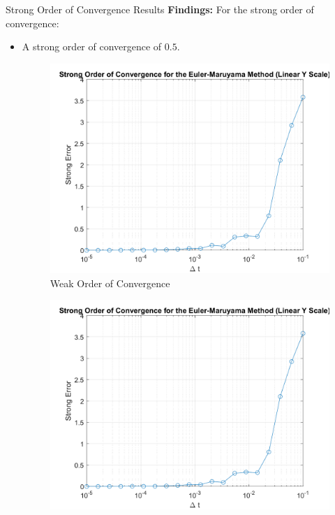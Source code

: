 \documentclass[compress,12pt]{beamer}
\begin{document}
\begin{frame}{Strong Order of Convergence Results}
    \textbf{Findings:} For the strong order of convergence:
    
    \begin{itemize}
        \item A strong order of convergence of \(0.5\). 
            
            \begin{minipage}{0.4\textwidth}
            \begin{figure}
                \centering
                \includegraphics[width=\linewidth]{project4Q3fig3.png} %
                \caption{Weak Order of Convergence}
                \label{fig:enter-label}
            \end{figure}
            \end{minipage}%
            \hfill %
            \begin{minipage}{0.4\textwidth}
            \begin{figure}
                \centering
                \includegraphics[width=\linewidth]{project4Q3fig3.png} %

\end{figure}
\end{minipage}
\end{itemize}
\end{frame}
\end{document}
